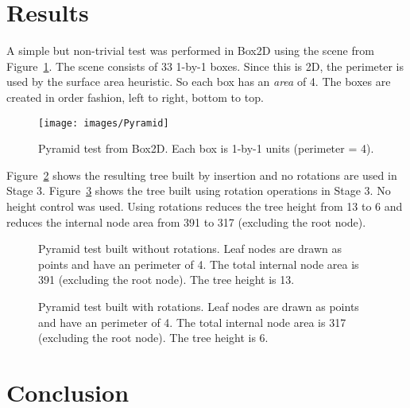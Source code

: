 \documentclass{article}
\begin{document}
\section{Results}

A simple but non-trivial test was performed in Box2D using the scene from Figure~\ref{fig:pyramid}. The scene consists of 33 1-by-1 boxes. Since this is 2D, the perimeter is used by the surface area heuristic. So each box has an \emph{area} of 4. The boxes are created in order fashion, left to right, bottom to top.

\begin{figure}
	\begin{center}
		\texttt{[image: images/Pyramid]}
	\end{center}
	\caption{ Pyramid test from Box2D. Each box is 1-by-1 units (perimeter = 4).}
	\label{fig:pyramid}
\end{figure}

Figure~\ref{fig:pyramid_base} shows the resulting tree built by insertion and no rotations are used in Stage 3. Figure~\ref{fig:pyramid_rotate} shows the tree built using rotation operations in Stage 3. No height control was used. Using rotations reduces the tree height from 13 to 6 and reduces the internal node area from 391 to 317 (excluding the root node).

\begin{figure}
	\begin{center}
		
	\end{center}
	\caption{ Pyramid test built without rotations. Leaf nodes are drawn as points and have an perimeter of 4. The total internal node area is 391 (excluding the root node). The tree height is 13. }
	\label{fig:pyramid_base}
\end{figure}

\begin{figure}
	\begin{center}
		
	\end{center}
	\caption{ Pyramid test built with rotations. Leaf nodes are drawn as points and have an perimeter of 4. The total internal node area is 317 (excluding the root node). The tree height is 6. }
	\label{fig:pyramid_rotate}
\end{figure}

\section{Conclusion}



\end{document}
